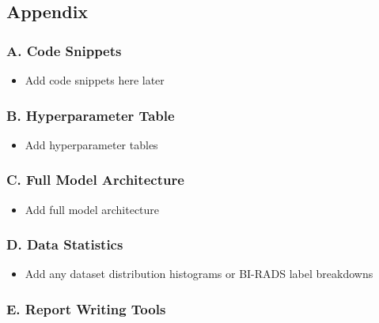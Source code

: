 \documentclass[
  12pt,
  letterpaper,
  DIV=11,
  numbers=noendperiod]{scrartcl}
\providecommand{\tightlist}{%
  \setlength{\itemsep}{0pt}\setlength{\parskip}{0pt}}
\begin{document}
\subsection{Appendix}\label{appendix}

\subsubsection{A. Code Snippets}\label{a.-code-snippets}

\begin{itemize}
\tightlist
\item
  Add code snippets here later
\end{itemize}

\subsubsection{B. Hyperparameter Table}\label{b.-hyperparameter-table}

\begin{itemize}
\tightlist
\item
  Add hyperparameter tables
\end{itemize}

\subsubsection{C. Full Model
Architecture}\label{c.-full-model-architecture}

\begin{itemize}
\tightlist
\item
  Add full model architecture
\end{itemize}

\subsubsection{D. Data Statistics}\label{d.-data-statistics}

\begin{itemize}
\tightlist
\item
  Add any dataset distribution histograms or BI-RADS label breakdowns
\end{itemize}

\subsubsection{E. Report Writing Tools}\label{e.-report-writing-tools}
\end{document}

